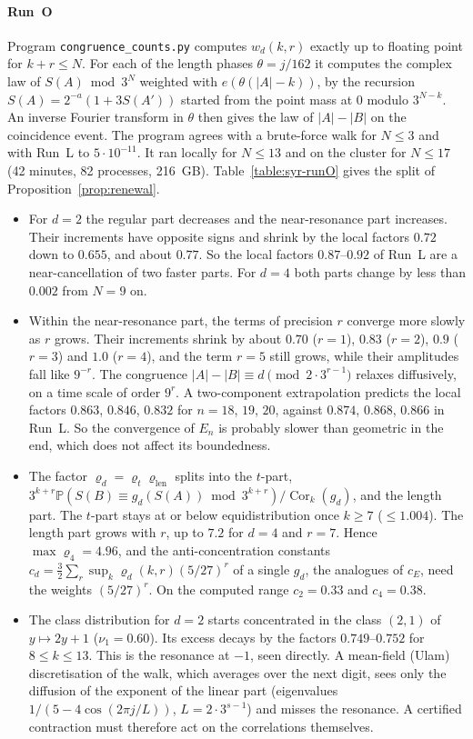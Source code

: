 \documentclass[12pt]{amsart}
\theoremstyle{definition}
\theoremstyle{remark}
\begin{document}
\paragraph{Run~O} Program \texttt{congruence\_counts.py} computes $w_d(k,r)$ exactly up to floating point for $k+r\le N$. For each of the length phases $\theta=j/162$ it computes the complex law of $S(A)\bmod3^N$ weighted with $e(\theta(|A|-k))$, by the recursion $S(A)=2^{-a}(1+3S(A'))$ started from the point mass at $0$ modulo $3^{N-k}$. An inverse Fourier transform in $\theta$ then gives the law of $|A|-|B|$ on the coincidence event. The program agrees with a brute-force walk for $N\le3$ and with Run~L to $5\cdot10^{-11}$. It ran locally for $N\le13$ and on the cluster for $N\le17$ (42 minutes, 82 processes, 216~GB). Table~\ref{table:syr-runO} gives the split of Proposition~\ref{prop:renewal}.
\begin{itemize}
\item For $d=2$ the regular part decreases and the near-resonance part increases. Their increments have opposite signs and shrink by the local factors $0.72$ down to $0.655$, and about $0.77$. So the local factors $0.87$--$0.92$ of Run~L are a near-cancellation of two faster parts. For $d=4$ both parts change by less than $0.002$ from $N=9$ on.
\item Within the near-resonance part, the terms of precision $r$ converge more slowly as $r$ grows. Their increments shrink by about $0.70$ ($r=1$), $0.83$ ($r=2$), $0.9$ ($r=3$) and $1.0$ ($r=4$), and the term $r=5$ still grows, while their amplitudes fall like $9^{-r}$. The congruence $|A|-|B|\equiv d\pmod{2\cdot3^{r-1}}$ relaxes diffusively, on a time scale of order $9^r$. A two-component extrapolation predicts the local factors $0.863$, $0.846$, $0.832$ for $n=18$, $19$, $20$, against $0.874$, $0.868$, $0.866$ in Run~L. So the convergence of $E_n$ is probably slower than geometric in the end, which does not affect its boundedness.
\item The factor $\varrho_d=\varrho_t\varrho_{\mathrm{len}}$ splits into the $t$-part, $3^{k+r}\mathbb P(S(B)\equiv g_d(S(A))\bmod3^{k+r})/\operatorname{Cor}_k(g_d)$, and the length part. The $t$-part stays at or below equidistribution once $k\ge7$ ($\le1.004$). The length part grows with $r$, up to $7.2$ for $d=4$ and $r=7$. Hence $\max\varrho_4=4.96$, and the anti-concentration constants $c_d=\frac32\sum_r\sup_k\varrho_d(k,r)(5/27)^r$ of a single $g_d$, the analogues of $c_E$, need the weights $(5/27)^r$. On the computed range $c_2=0.33$ and $c_4=0.38$.
\item The class distribution for $d=2$ starts concentrated in the class $(2,1)$ of $y\mapsto2y+1$ ($\nu_1=0.60$). Its excess decays by the factors $0.749$--$0.752$ for $8\le k\le13$. This is the resonance at $-1$, seen directly. A mean-field (Ulam) discretisation of the walk, which averages over the next digit, sees only the diffusion of the exponent of the linear part (eigenvalues $1/(5-4\cos(2\pi j/L))$, $L=2\cdot3^{s-1}$) and misses the resonance. A certified contraction must therefore act on the correlations themselves.
\end{itemize}
\end{document}
